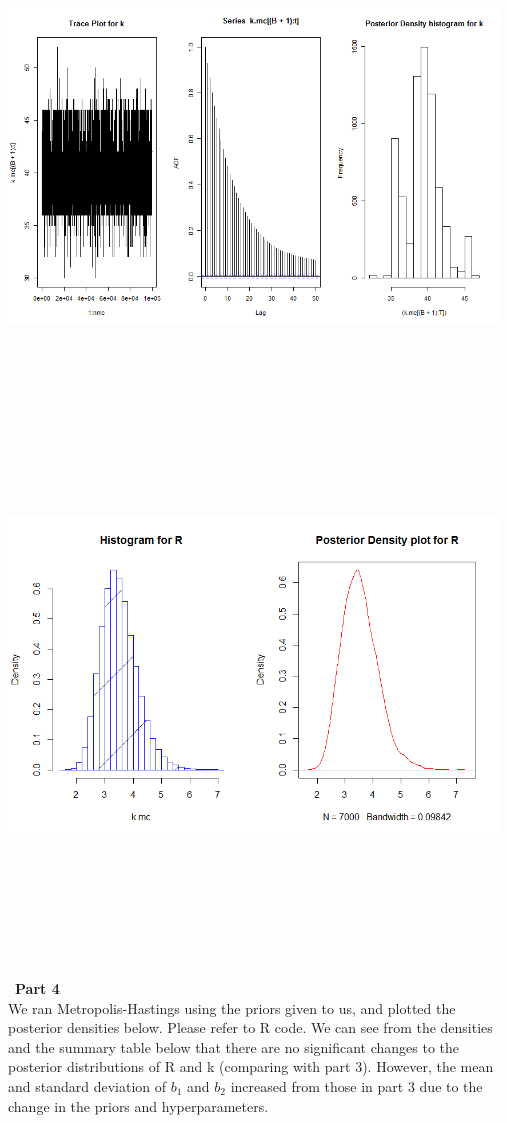 \documentclass[10pt,a4paper]{article}
\begin{document}
\centerline{\includegraphics[width=13cm,height=13cm,keepaspectratio]{./images/31}}
\centerline{\includegraphics[width=13cm,height=13cm,keepaspectratio]{./images/32}}
\text{}\\
\\\
\textbf{Part 4} \\
We ran Metropolis-Hastings using the priors given to us, and plotted the posterior densities below. Please refer to R code. We can see from the densities and the summary table below that there are no significant changes to the posterior distributions of R and k (comparing with part 3). However, the mean and standard deviation of $b_1$ and $b_2$ increased from those in part 3 due to the change in the priors and hyperparameters. 
\end{document}
